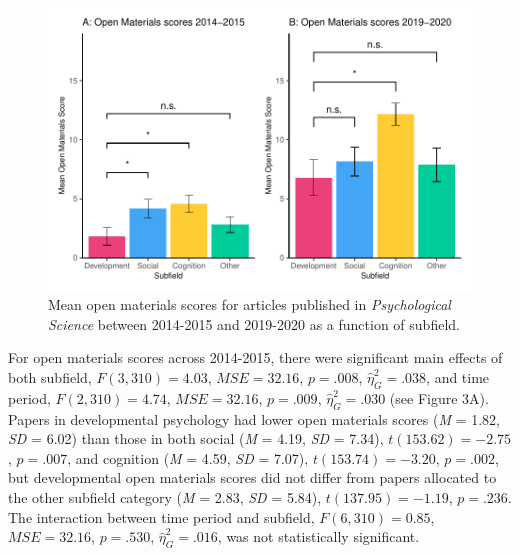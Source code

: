 \documentclass[
  english,
  man,floatsintext]{apa6}
\begin{document}
\begin{figure}
\centering
\includegraphics{icd_special_issue_files/figure-latex/unnamed-chunk-4-1.pdf}
\caption{\label{fig:unnamed-chunk-4}Mean open materials scores for articles published in \emph{Psychological Science} between 2014-2015 and 2019-2020 as a function of subfield.}
\end{figure}

For open materials scores across 2014-2015, there were significant main effects of both subfield, \(F(3, 310) = 4.03\), \(\mathit{MSE} = 32.16\), \(p = .008\), \(\hat{\eta}^2_G = .038\), and time period, \(F(2, 310) = 4.74\), \(\mathit{MSE} = 32.16\), \(p = .009\), \(\hat{\eta}^2_G = .030\) (see Figure 3A). Papers in developmental psychology had lower open materials scores (\emph{M} = 1.82, \emph{SD} = 6.02) than those in both social (\emph{M} = 4.19, \emph{SD} = 7.34), \(t(153.62) = -2.75\), \(p = .007\), and cognition (\emph{M} = 4.59, \emph{SD} = 7.07), \(t(153.74) = -3.20\), \(p = .002\), but developmental open materials scores did not differ from papers allocated to the other subfield category (\emph{M} = 2.83, \emph{SD} = 5.84), \(t(137.95) = -1.19\), \(p = .236\). The interaction between time period and subfield, \(F(6, 310) = 0.85\), \(\mathit{MSE} = 32.16\), \(p = .530\), \(\hat{\eta}^2_G = .016\), was not statistically significant.
\end{document}
